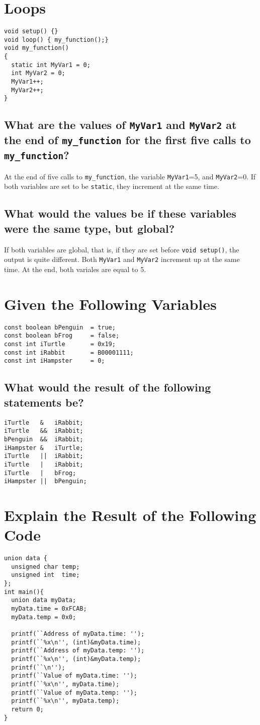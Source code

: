 \documentclass{hw}
\begin{document}
\section{Loops}
\begin{lstlisting}
void setup() {}
void loop() { my_function();}
void my_function()
{
  static int MyVar1 = 0;
  int MyVar2 = 0;
  MyVar1++;
  MyVar2++;
}
\end{lstlisting}
\subsection{What are the values of \texttt{MyVar1} and \texttt{MyVar2} at the end
of \texttt{my\_function} for the first five calls to \texttt{my\_function}?}
At the end of five calls to \texttt{my\_function}, the variable
\texttt{MyVar1}=5, and \texttt{MyVar2}=0. If both variables are set to be
\texttt{static}, they increment at the same time.
\subsection{What would the values be if these variables were the same type, but
global?}
If both variables are global, that is, if they are set before \texttt{void
setup()}, the output is quite different. Both \texttt{MyVar1} and
\texttt{MyVar2} increment up at the same time. At the end, both variales are
equal to 5.

\section{Given the Following Variables}
\begin{lstlisting}
const boolean bPenguin  = true;
const boolean bFrog     = false;
const int iTurtle       = 0x19;
const int iRabbit       = B00001111;
const int iHampster     = 0;
\end{lstlisting}
\newpage
\subsection{What would the result of the following statements be?}
\begin{lstlisting}
iTurtle   &   iRabbit;
iTurtle   &&  iRabbit;
bPenguin  &&  iRabbit;
iHampster &   iTurtle;
iTurtle   ||  iRabbit;
iTurtle   |   iRabbit;
iTurtle   |   bFrog;
iHampster ||  bPenguin;
\end{lstlisting}

\section{Explain the Result of the Following Code}
\begin{lstlisting}
union data {
  unsigned char temp;
  unsigned int  time;
};
int main(){
  union data myData;
  myData.time = 0xFCAB;
  myData.temp = 0x0;

  printf(``Address of myData.time: '');
  printf(``%x\n'', (int)&myData.time);
  printf(``Address of myData.temp: '');
  printf(``%x\n'', (int)&myData.temp);
  printf(``\n'');
  printf(``Value of myData.time: '');
  printf(``%x\n'', myData.time);
  printf(``Value of myData.temp: '');
  printf(``%x\n'', myData.temp);
  return 0;
}
\end{lstlisting}
\end{document}
